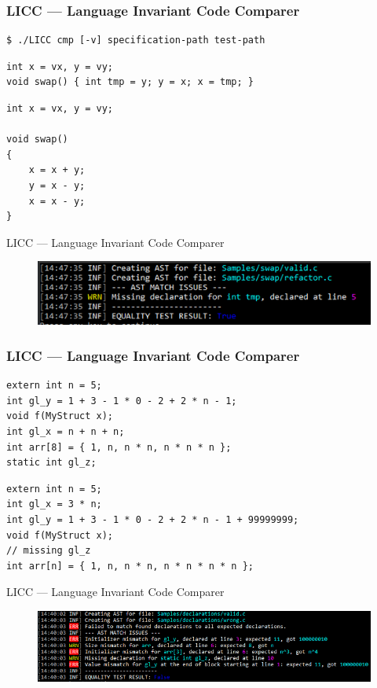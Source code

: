 \documentclass{beamer}
\begin{document}
\begin{frame}[fragile]
    \frametitle{LICC --- Language Invariant Code Comparer}
\begin{lstlisting}[numbers=none,language={}]
$ ./LICC cmp [-v] specification-path test-path
\end{lstlisting}
\begin{lstlisting}
int x = vx, y = vy;
void swap() { int tmp = y; y = x; x = tmp; }
\end{lstlisting}
\begin{lstlisting}
int x = vx, y = vy;

void swap() 
{
    x = x + y;
    y = x - y;
    x = x - y;
}
\end{lstlisting}
\end{frame}

\begin{frame}{LICC --- Language Invariant Code Comparer}
    \begin{figure}[h!]
        \centering
        \includegraphics[scale=0.7]{images/eval/swap_valid_refactor.PNG}
    \end{figure}
\end{frame}

\begin{frame}[fragile]
    \frametitle{LICC --- Language Invariant Code Comparer}
\begin{lstlisting}
extern int n = 5;
int gl_y = 1 + 3 - 1 * 0 - 2 + 2 * n - 1;
void f(MyStruct x);
int gl_x = n + n + n;
int arr[8] = { 1, n, n * n, n * n * n };
static int gl_z;
\end{lstlisting}
\begin{lstlisting}
extern int n = 5;
int gl_x = 3 * n;
int gl_y = 1 + 3 - 1 * 0 - 2 + 2 * n - 1 + 99999999;
void f(MyStruct x);
// missing gl_z
int arr[n] = { 1, n, n * n, n * n * n * n };
\end{lstlisting}
\end{frame}

\begin{frame}{LICC --- Language Invariant Code Comparer}
    \begin{figure}[h!]
        \centering
        \includegraphics[scale=0.55]{images/eval/decl_valid_wrong.PNG}
    \end{figure}
\end{frame}
\end{document}
